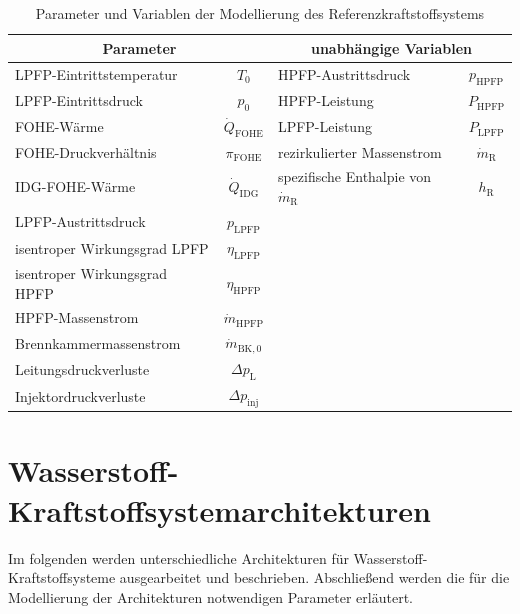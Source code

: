 \begin{table}[ht]
    \centering
	\caption{Parameter und Variablen der Modellierung des  Referenzkraftstoffsystems}
	\begin{tabular} {|l|c|l|c|} \hline%
		\multicolumn{2}{|c}{Parameter} & \multicolumn{2}{|c|}{unabhängige Variablen}\\ \hline\hline%
        LPFP-Eintrittstemperatur & $T_0$ & HPFP-Austrittsdruck & $p_{\mathrm{HPFP}}$ \\ \hline
        LPFP-Eintrittsdruck & $p_0$ & HPFP-Leistung & $P_{\mathrm{HPFP}}$ \\ \hline
        FOHE-Wärme & $\dot{Q}_{\mathrm{FOHE}}$ & LPFP-Leistung & $P_{\mathrm{LPFP}}$ \\ \hline
        FOHE-Druckverhältnis & $\pi_{\mathrm{FOHE}}$ & rezirkulierter Massenstrom & $\dot{m}_\mathrm{R}$ \\ \hline
        IDG-FOHE-Wärme  & $\dot{Q}_{\mathrm{IDG}}$ & spezifische Enthalpie von $\dot{m}_\mathrm{R}$ & $h_\mathrm{R}$                 \\ \hline
        LPFP-Austrittsdruck & $p_{\mathrm{LPFP}}$& \multicolumn{2}{c|}{}\\ \hline
        isentroper Wirkungsgrad LPFP & $\eta_{\mathrm{LPFP}}$& \multicolumn{2}{c|}{}\\ \hline
        isentroper Wirkungsgrad HPFP & $\eta_{\mathrm{HPFP}}$& \multicolumn{2}{c|}{}\\ \hline
        HPFP-Massenstrom & $\dot{m}_{\mathrm{HPFP}}$& \multicolumn{2}{c|}{}\\ \hline
        Brennkammermassenstrom & $\dot{m}_{\mathrm{BK},0}$& \multicolumn{2}{c|}{}\\ \hline
        Leitungsdruckverluste & $\Delta p_{\mathrm{L}}$& \multicolumn{2}{c|}{}\\ \hline
        Injektordruckverluste & $\Delta p_{\mathrm{inj}}$& \multicolumn{2}{c|}{}\\ \hline
	\end{tabular}	
    \label{Tab:referenz_params}%
\end{table}
\FloatBarrier 

\section{Wasserstoff-Kraftstoffsystemarchitekturen}

Im folgenden werden unterschiedliche Architekturen für Wasserstoff-Kraftstoffsysteme ausgearbeitet und beschrieben. Abschließend werden die für die Modellierung der Architekturen notwendigen Parameter erläutert. 

